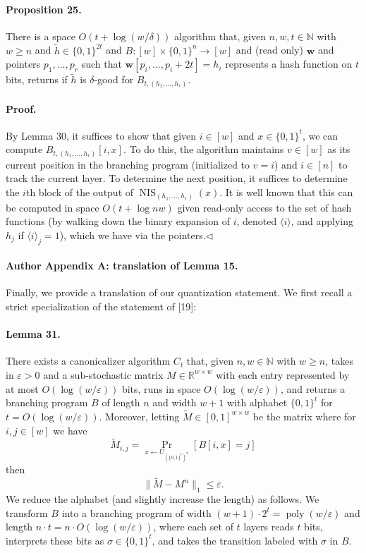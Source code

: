 \documentclass[10pt,a4paper]{article}
\begin{document}
\paragraph{Proposition 25.} There is a space $O(t+\log(w/\delta))$ algorithm that, given $n,w,t\in\mathbb N$ with $w\geq n$ and $\widetilde h\in\{0,1\}^{2t}$ and $B:[w]\times\{0,1\}^n\to[w]$ and (read only) $\mathbf w$ and pointers $p_1,\ldots,p_r$ such that $\mathbf w[p_i,\ldots,p_i+2t]=h_i$ represents a hash function on $t$ bits, returns if $\widetilde h$ is $\delta$-good for $B_{t,(h_1,\ldots,h_r)}$.
\paragraph{Proof.} By Lemma 30, it suffices to show that given $i\in[w]$ and $x\in\{0,1\}^t$, we can compute $B_{t,(h_1,\ldots,h_r)}[i,x]$. To do this, the algorithm maintains $v\in[w]$ as its current position in the branching program (initialized to $v=i$) and $i\in[n]$ to track the current layer. To determine the next position, it suffices to determine the $i$th block of the output of $\operatorname{NIS}_{(h_1,\ldots,h_r)}(x)$. It is well known that this can be computed in space $O(t+\log nw)$ given read-only access to the set of hash functions (by walking down the binary expansion of $i$, denoted $\langle i\rangle$, and applying $h_j$ if $\langle i\rangle_j=1$), which we have via the pointers.\hfill$\triangleleft$

\paragraph{Author Appendix A: translation of Lemma 15.} Finally, we provide a translation of our quantization statement. We first recall a strict specialization of the statement of [19]:
\paragraph{Lemma 31.} There exists a canonicalizer algorithm $C_t$ that, given $n,w\in\mathbb N$ with $w\geq n$, takes in $\varepsilon>0$ and a sub-stochastic matrix $M\in\mathbb R^{w\times w}$ with each entry represented by at most $O(\log(w/\varepsilon))$ bits, runs in space $O(\log(w/\varepsilon))$, and returns a branching program $B$ of length $n$ and width $w+1$ with alphabet $\{0,1\}^t$ for $t=O(\log(w/\varepsilon))$. Moreover, letting $\widetilde M\in[0,1]^{w\times w}$ be the matrix where for $i,j\in[w]$ we have
\[\widetilde M_{i,j}=\Pr_{x\leftarrow U_{(\{0,1\}^t)^n}}[B[i,x]=j]\]
then
\[\|\widetilde M-M^n\|_1\leq\varepsilon.\]
We reduce the alphabet (and slightly increase the length) as follows. We transform $B$ into a branching program of width $(w+1)\cdot2^t=\operatorname{poly}(w/\varepsilon)$ and length $n\cdot t=n\cdot O(\log(w/\varepsilon))$, where each set of $t$ layers reads $t$ bits, interprets these bits as $\sigma\in\{0,1\}^t$, and takes the transition labeled with $\sigma$ in $B$.
\end{document}
